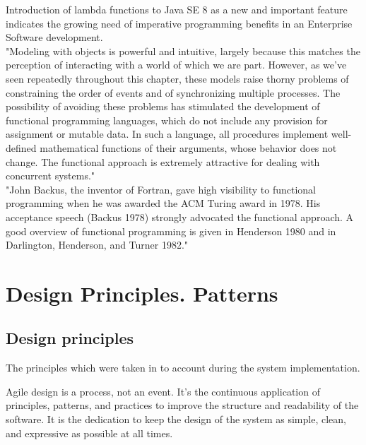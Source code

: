 Introduction of lambda functions to Java SE 8 as a new and important feature\cite{javase} indicates the growing need of imperative programming benefits in an Enterprise Software development.\\

"Modeling with objects is powerful and intuitive, largely because this matches the perception of interacting with a world of which we are part. However, as we've seen repeatedly throughout this chapter, these models raise thorny problems of constraining the order of events and of synchronizing multiple processes. The possibility of avoiding these problems has stimulated the development of functional programming languages, which do not include any provision for assignment or mutable data. In such a language, all procedures implement well-defined mathematical functions of their arguments, whose behavior does not change. The functional approach is extremely attractive for dealing with concurrent systems." \cite{sicp}\\

"John Backus, the inventor of Fortran, gave high visibility to functional programming when he was awarded the ACM Turing award in 1978. His acceptance speech (Backus 1978) strongly advocated the functional approach. A good overview of functional programming is given in Henderson 1980 and in Darlington, Henderson, and Turner 1982."\cite{sicp}\\


\section{Design Principles. Patterns}

\subsection{Design principles}
The principles which were taken in to account during the system implementation.

Agile design is a process, not an event.
It's the continuous application of principles, patterns, and practices to improve the structure and readability of the software. 
It is the dedication to keep the design of the system as simple, clean, and expressive as possible at all times.\cite{MartinASD}

